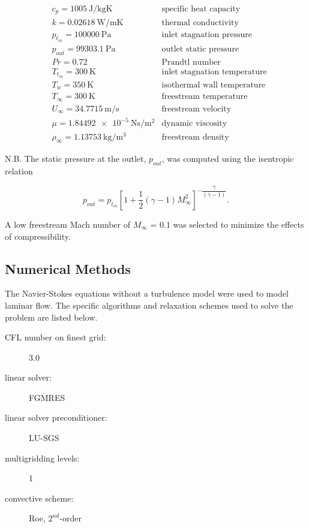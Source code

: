\documentclass[12pt,letterpaper]{article}
\begin{document}
\begin{align*}
&c_p = \SI{1005}{\joule\per\kilogram\kelvin} & \text{specific heat capacity} \\
&k = \SI{0.02618}{\watt\per\meter\kelvin} & \text{thermal conductivity} \\
&p_{t_{in}} = \SI{100000}{\pascal} & \text{inlet stagnation pressure} \\
&p_{out} = \SI{99303.1}{\pascal} & \text{outlet static pressure} \\
&Pr = 0.72 &\text{Prandtl number} \\
&T_{t_{in}} = \SI{300}{\kelvin} & \text{inlet stagnation temperature} \\
&T_w = \SI{350}{\kelvin} & \text{isothermal wall temperature} \\
&T_\infty = \SI{300}{\kelvin} & \text{freestream temperature} \\
&U_\infty = \SI{34.7715}{\meter\per\second} & \text{freestream velocity}\\
&\mu = \SI{1.84492e-5}{\newton\second\per\meter\squared} & \text{dynamic viscosity} \\
&\rho_\infty = \SI{1.13753}{\kilogram\per\meter\cubed} & \text{freestream density}
\end{align*}

N.B. The static pressure at the outlet, $p_{out}$, was computed using the isentropic relation

\begin{equation*}
p_{out} = p_{t_{in}}\left[ 1+\dfrac{1}{2}\left( \gamma-1\right) M_\infty^2 \right] ^{-\dfrac{\gamma}{\left( \gamma-1\right) }}.
\end{equation*}

A low freestream Mach number of $M_\infty$ = 0.1 was selected to minimize the effects of compressibility.

\subsection*{Numerical Methods}
The Navier-Stokes equations without a turbulence model were used to model laminar flow. The specific algorithms and relaxation schemes used to solve the problem are listed below.

\begin{description}
\item[CFL number on finest grid:] 3.0
\item[linear solver:] FGMRES
\item[linear solver preconditioner:] LU-SGS
\item[multigridding levels:] 1
\item[convective scheme:] Roe, $2^{nd}$-order
\end{description}
\end{document}
